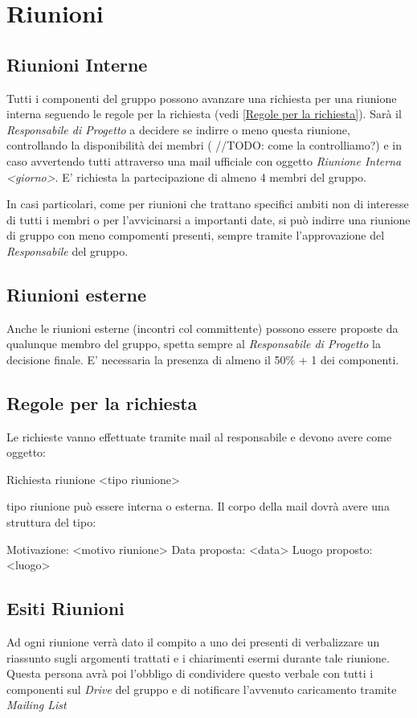 \section{Riunioni}

\subsection{Riunioni Interne}
Tutti i componenti del gruppo possono avanzare una richiesta per una riunione interna seguendo le regole per la richiesta (vedi \ref{Regole per la richiesta}).
Sarà il \textit{Responsabile di Progetto} a decidere se indirre o meno questa riunione, controllando la disponibilità dei membri ( //TODO: come la controlliamo?) e in caso avvertendo tutti attraverso una mail ufficiale con oggetto \textit{Riunione Interna <giorno>}.
E' richiesta la partecipazione di almeno 4 membri del gruppo.

In casi particolari, come per riunioni che trattano specifici ambiti non di interesse di tutti i membri o per l'avvicinarsi a importanti date, si può indirre una riunione di gruppo con meno compomenti presenti, sempre tramite l'approvazione del \textit{Responsabile} del gruppo.

\subsection{Riunioni esterne}
Anche le riunioni esterne (incontri col committente) possono essere proposte da qualunque membro del gruppo, spetta sempre al \textit{Responsabile di Progetto} la decisione finale.
E' necessaria la presenza di almeno il 50\% + 1 dei componenti.

\subsection{Regole per la richiesta}
Le richieste vanno effettuate tramite mail al responsabile e devono avere come oggetto:
\begin{center}
Richiesta riunione <tipo riunione>
\end{center}
tipo riunione può essere interna o esterna.
Il corpo della mail dovrà avere una struttura del tipo:
\begin{center}
Motivazione: <motivo riunione>
Data proposta: <data>
Luogo proposto: <luogo>
\end{center}

\subsection{Esiti Riunioni}
Ad ogni riunione verrà dato il compito a uno dei presenti di verbalizzare un riassunto sugli argomenti trattati e i chiarimenti esermi durante tale riunione.
Questa persona avrà poi l'obbligo di condividere questo verbale con tutti i componenti sul \textit{Drive} del gruppo e di notificare l'avvenuto caricamento tramite \textit{Mailing List}
